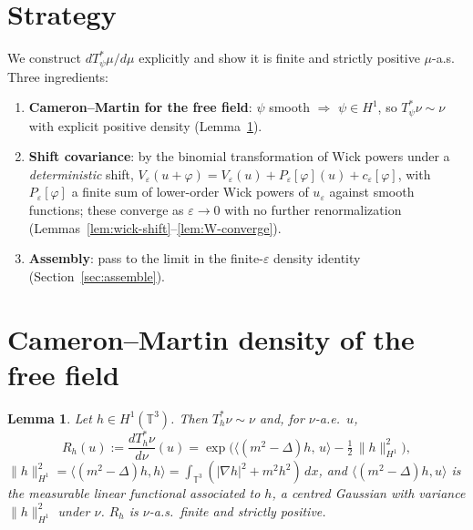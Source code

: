 \documentclass[12pt]{article}
\newcommand{\bT}{\mathbb{T}}
\newcommand{\eps}{\varepsilon}
\theoremstyle{plain}
\newtheorem{lemma}{Lemma}
\theoremstyle{definition}
\begin{document}
\section{Strategy}\label{sec:strategy}

We construct $dT_\psi^*\mu/d\mu$ explicitly and show it is finite and strictly
positive $\mu$-a.s. Three ingredients:
\begin{enumerate}
\item \textbf{Cameron--Martin for the free field}: $\psi$ smooth $\Rightarrow$
$\psi\in H^1$, so $T_\psi^*\nu\sim\nu$ with explicit positive density
(Lemma~\ref{lem:CM}).
\item \textbf{Shift covariance}: by the binomial transformation of Wick powers
under a \emph{deterministic} shift, $V_\eps(u+\varphi)=V_\eps(u)+P_\eps[\varphi](u)
+c_\eps[\varphi]$, with $P_\eps[\varphi]$ a finite sum of lower-order Wick powers
of $u_\eps$ against smooth functions; these converge as $\eps\to0$ with no further
renormalization (Lemmas~\ref{lem:wick-shift}--\ref{lem:W-converge}).
\item \textbf{Assembly}: pass to the limit in the finite-$\eps$ density identity
(Section~\ref{sec:assemble}).
\end{enumerate}

\section{Cameron--Martin density of the free field}\label{sec:CM}

\begin{lemma}\label{lem:CM}
Let $h\in H^1(\bT^3)$. Then $T_h^*\nu\sim\nu$ and, for $\nu$-a.e.\ $u$,
\begin{equation}\label{eq:CM-density}
R_h(u):=\frac{dT_h^*\nu}{d\nu}(u)=\exp\Big(\langle (m^2-\Delta)h,\,u\rangle
-\tfrac12\,\|h\|_{H^1}^2\Big),
\end{equation}
$\|h\|_{H^1}^2=\langle(m^2-\Delta)h,h\rangle=\int_{\bT^3}(|\nabla h|^2+m^2 h^2)\,dx$,
and $\langle(m^2-\Delta)h,u\rangle$ is the measurable linear functional associated
to $h$, a centred Gaussian with variance $\|h\|_{H^1}^2$ under $\nu$. $R_h$ is
$\nu$-a.s.\ finite and strictly positive.
\end{lemma}
\end{document}

